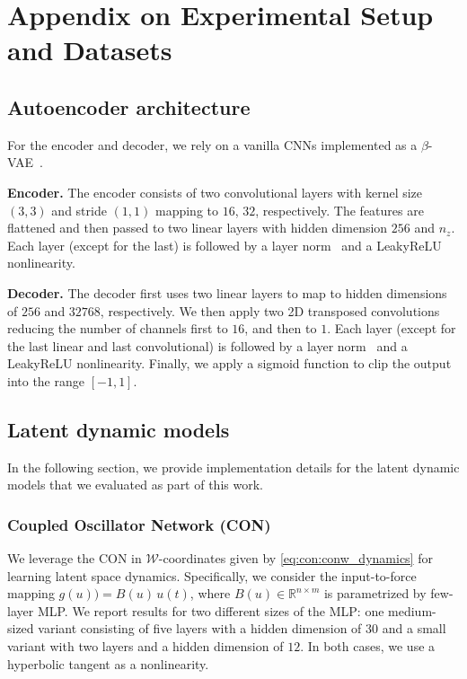 \section{Appendix on Experimental Setup and Datasets}\label{sec:apx-con:experimental_setup}

\subsection{Autoencoder architecture}
For the encoder and decoder, we rely on a vanilla \glspl{CNN} implemented as a $\beta$-\gls{VAE}~\citep{kingma2014auto}.

\textbf{Encoder.} The encoder consists of two convolutional layers with kernel size $(3, 3)$ and stride $(1, 1)$ mapping to $16$, $32$, respectively.
The features are flattened and then passed to two linear layers with hidden dimension $256$ and $n_z$.
Each layer (except for the last) is followed by a layer norm~\citep{ba2016layer} and a LeakyReLU nonlinearity.

\textbf{Decoder.} The decoder first uses two linear layers to map to hidden dimensions of $256$ and $32768$, respectively.
We then apply two 2D transposed convolutions~\citep{dumoulin2016guide} reducing the number of channels first to $16$, and then to $1$.
Each layer (except for the last linear and last convolutional) is followed by a layer norm~\citep{ba2016layer} and a LeakyReLU nonlinearity.
Finally, we apply a sigmoid function to clip the output into the range $[-1, 1]$.

\subsection{Latent dynamic models}\label{sub:apx-con:latent_dynamic_models}
In the following section, we provide implementation details for the latent dynamic models that we evaluated as part of this work.

\subsubsection{Coupled Oscillator Network (CON)}\label{ssub:apx-con:latent_space_dynamic_models:con}
We leverage the \gls{CON} in $\mathcal{W}$-coordinates given by \eqref{eq:con:conw_dynamics} for learning latent space dynamics. 
Specifically, we consider the input-to-force mapping $g(u)) = B(u) \, u(t)$, where $B(u) \in \mathbb{R}^{n \times m}$ is parametrized by few-layer \gls{MLP}. We report results for two different sizes of the \gls{MLP}: one medium-sized variant consisting of five layers with a hidden dimension of $30$ and a small variant with two layers and a hidden dimension of $12$. In both cases, we use a hyperbolic tangent as a nonlinearity.


